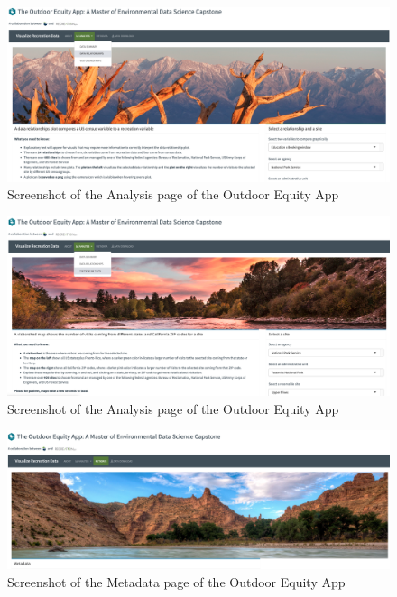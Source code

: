 \documentclass[
  11 pt,
  openany]{book}
\begin{document}
\begin{figure}
\includegraphics[width=5.96in]{images/screenshot_data-relationship} \caption{Screenshot of the Analysis page of the Outdoor Equity App}\label{fig:app-screenshot3}
\end{figure}

\begin{figure}
\includegraphics[width=5.95in]{images/screenshot_visitorshed} \caption{Screenshot of the Analysis page of the Outdoor Equity App}\label{fig:app-screenshot4}
\end{figure}

\begin{figure}
\includegraphics[width=5.97in]{images/screenshot_metadata} \caption{Screenshot of the Metadata page of the Outdoor Equity App}\label{fig:app-screenshot5}
\end{figure}
\end{document}
